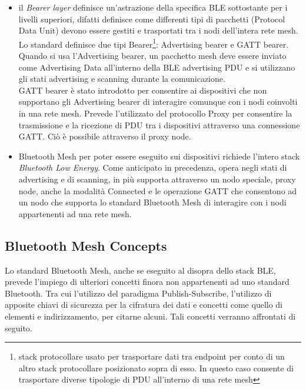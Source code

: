 \begin{itemize}
    \item il \textit{Bearer layer} definisce un'astrazione della specifica BLE sottostante per i livelli superiori, difatti definisce come differenti tipi di pacchetti (Protocol Data Unit) devono essere gestiti e trasportati tra i nodi dell'intera rete mesh. Lo standard definisce due tipi Bearer\footnote{stack protocollare usato per trasportare dati tra endpoint per conto di un altro stack protocollare posizionato sopra di esso. In questo caso consente di trasportare diverse tipologie di PDU all'interno di una rete mesh}: Advertising bearer e GATT bearer. \\
    Quando si usa l'Advertising bearer, un pacchetto mesh deve essere inviato come Advertising Data all'interno della BLE advertising PDU e si utilizzano gli stati advertising e scanning durante la comunicazione.\\
    GATT bearer è stato introdotto per consentire ai dispositivi che non supportano gli Advertising bearer di interagire comunque con i nodi coinvolti in una rete mesh. Prevede l'utilizzato del protocollo Proxy per consentire la trasmissione e la ricezione di PDU tra i dispositivi attraverso una connessione GATT. Ciò è possibile attraverso il proxy node.

    \item Bluetooth Mesh per poter essere eseguito sui dispositivi richiede l'intero stack \textit{Bluetooth Low Energy}. Come anticipato in precedenza, opera negli stati di advertising e di scanning, in più supporta attraverso un nodo speciale, proxy node, anche la modalità Connected e le operazione GATT che consentono ad un nodo che supporta lo standard Bluetooth Mesh di interagire con i nodi appartenenti ad una rete mesh.
\end{itemize}

\subsection{Bluetooth Mesh Concepts}
Lo standard Bluetooth Mesh, anche se eseguito al disopra dello stack BLE, prevede l'impiego di ulteriori concetti finora non appartenenti ad uno standard Bluetooth. Tra cui l'utilizzo del paradigma Publish-Subscribe, l'utilizzo di apposite chiavi di sicurezza per la cifratura dei dati e concetti come quello di elementi e indirizzamento, per citarne alcuni. 
Tali concetti verranno affrontati di seguito.

